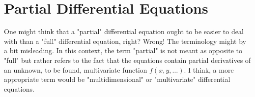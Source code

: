 \section{Partial Differential Equations}
One might think that a "partial" differential equation ought to be easier to deal with than a "full" differential equation, right? Wrong! The terminology might by a bit misleading. In this context, the term "partial" is not meant as opposite to "full" but rather refers to the fact that the equations contain partial derivatives of an unknown, to be found, multivariate function $f(x,y,\ldots)$. I think, a more appropriate term would be "multidimensional" or "multivariate" differential equations.